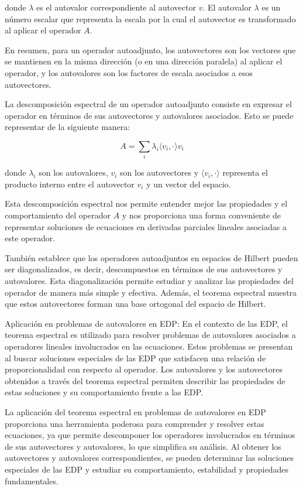 \documentclass{article}
\begin{document}
    donde $\lambda$ es el autovalor correspondiente al autovector $v$. El autovalor $\lambda$ es un número escalar que representa la escala por la cual el autovector es transformado al aplicar el operador $A$.
    
    En resumen, para un operador autoadjunto, los autovectores son los vectores que se mantienen en la misma dirección (o en una dirección paralela) al aplicar el operador, y los autovalores son los factores de escala asociados a esos autovectores.
    
    La descomposición espectral de un operador autoadjunto consiste en expresar el operador en términos de sus autovectores y autovalores asociados. Esto se puede representar de la siguiente manera:
    
    \begin{equation}
    A = \sum_{i} \lambda_i \langle v_i, \cdot \rangle v_i
    \end{equation}
    
    donde $\lambda_i$ son los autovalores, $v_i$ son los autovectores y $\langle v_i, \cdot \rangle$ representa el producto interno entre el autovector $v_i$ y un vector del espacio.
    
    Esta descomposición espectral nos permite entender mejor las propiedades y el comportamiento del operador $A$ y nos proporciona una forma conveniente de representar soluciones de ecuaciones en derivadas parciales lineales asociadas a este operador.
    
    También establece que los operadores autoadjuntos en espacios de Hilbert pueden ser diagonalizados, es decir, descompuestos en términos de sus autovectores y autovalores. Esta diagonalización permite estudiar y analizar las propiedades del operador de manera más simple y efectiva. Además, el teorema espectral muestra que estos autovectores forman una base ortogonal del espacio de Hilbert.

    Aplicación en problemas de autovalores en EDP: En el contexto de las EDP, el teorema espectral es utilizado para resolver problemas de autovalores asociados a operadores lineales involucrados en las ecuaciones. Estos problemas se presentan al buscar soluciones especiales de las EDP que satisfacen una relación de proporcionalidad con respecto al operador. Los autovalores y los autovectores obtenidos a través del teorema espectral permiten describir las propiedades de estas soluciones y su comportamiento frente a las EDP.

    La aplicación del teorema espectral en problemas de autovalores en EDP proporciona una herramienta poderosa para comprender y resolver estas ecuaciones, ya que permite descomponer los operadores involucrados en términos de sus autovectores y autovalores, lo que simplifica su análisis. Al obtener los autovectores y autovalores correspondientes, se pueden determinar las soluciones especiales de las EDP y estudiar su comportamiento, estabilidad y propiedades fundamentales.
\end{document}
